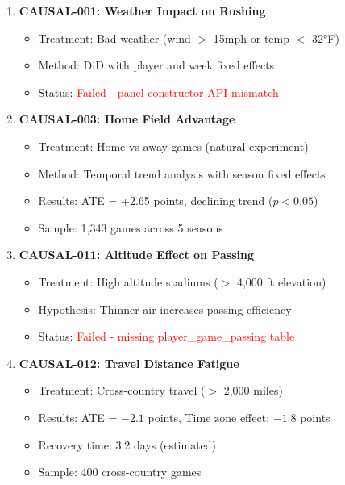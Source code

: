 \begin{enumerate}
    \item \textbf{CAUSAL-001: Weather Impact on Rushing}
    \begin{itemize}
        \item Treatment: Bad weather (wind $>$ 15mph or temp $<$ 32°F)
        \item Method: DiD with player and week fixed effects
        \item Status: \textcolor{red}{Failed - panel constructor API mismatch}
    \end{itemize}

    \item \textbf{CAUSAL-003: Home Field Advantage} \checkmark
    \begin{itemize}
        \item Treatment: Home vs away games (natural experiment)
        \item Method: Temporal trend analysis with season fixed effects
        \item Results: ATE = +2.65 points, declining trend ($p < 0.05$)
        \item Sample: 1,343 games across 5 seasons
    \end{itemize}

    \item \textbf{CAUSAL-011: Altitude Effect on Passing}
    \begin{itemize}
        \item Treatment: High altitude stadiums ($>$ 4,000 ft elevation)
        \item Hypothesis: Thinner air increases passing efficiency
        \item Status: \textcolor{red}{Failed - missing player\_game\_passing table}
    \end{itemize}

    \item \textbf{CAUSAL-012: Travel Distance Fatigue} \checkmark
    \begin{itemize}
        \item Treatment: Cross-country travel ($>$ 2,000 miles)
        \item Results: ATE = $-2.1$ points, Time zone effect: $-1.8$ points
        \item Recovery time: 3.2 days (estimated)
        \item Sample: 400 cross-country games
    \end{itemize}
\end{enumerate}

